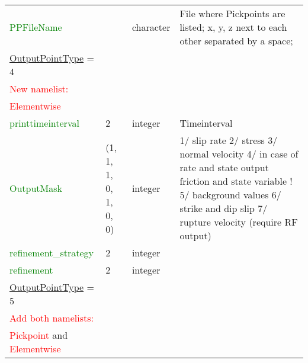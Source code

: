 \documentclass[12pt,twoside]{article}
\begin{document}
\begin{longtable}{|p{4.8cm}|p{2.4cm}|p{2cm}|p{5cm}|}
\textcolor{green}{PPFileName} & & character& File where Pickpoints are listed; x, y, z next to each other separated by a space;\\
\hdashline
\uline{OutputPointType} = 4 & & &\\
\textcolor{red}{New namelist:} & & &\\
\textcolor{red}{Elementwise} & & &\\
\textcolor{green}{printtimeinterval} & 2 & integer & Timeinterval \\
\textcolor{green}{OutputMask} & (1, 1, 1, 0, 1, 0, 0)& integer & 1/ slip rate 2/ stress 3/ normal velocity 4/ in case of rate and state output friction and state variable
                               ! 5/ background values 6/ strike and dip slip 7/ rupture velocity (require RF output)\\
\textcolor{green}{refinement\_strategy} & 2 & integer & \\
\textcolor{green}{refinement} & 2 & integer & \\
\hdashline
\uline{OutputPointType} = 5 & & &\\
\textcolor{red}{Add both namelists:} & & &\\
\textcolor{red}{Pickpoint} and \textcolor{red}{Elementwise} & & &\\
\hline
\end{longtable}
\end{document}
